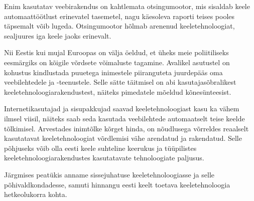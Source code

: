 \begin{multicols}{2}
Enim kasutatav veebirakendus on kahtle\-mata otsingumootor, mis sisaldab keele automaattöötlust erinevatel tasemetel, nagu käesoleva raporti teises pooles täpsemalt võib lugeda.  Otsingumootor hõlmab arenenud keeletehnoloogiat, sealjuures iga keele jaoks erinevalt.

Nii Eestis kui mujal Euroopas on välja öeldud, et üheks meie poliitiliseks eesmärgiks on kõigile võrdsete võimaluste tagamine.  Avalikel asutustel on kohustus kindlustada puuetega inimestele piiranguteta juurdepääs oma veebilehtedele ja -teenustele.  Selle sätte täitmisel on abi kasutajasõbralikest keeletehnoloogiarakendustest, näi\-teks pimedatele mõeldud kõnesünteesist.

Internetikasutajad ja sisupakkujad saavad keeletehnoloogiast kasu ka vähem ilmsel viisil, näiteks saab seda kasutada veebi\-lehtede automaatselt teise keelde tõlkimisel.  Arvestades inimtõlke kõrget hinda, on nõudlusega võrreldes reaalselt kasutatavat keeletehnoloogiat võrdlemisi vähe arendatud ja rakendatud.  Selle põhjuseks võib olla eesti keele suhteline keerukus ja tüüpilistes keeletehnoloogiarakendustes kasutatavate tehnoloogiate paljusus.

Järgmises peatükis anname sissejuhatuse keeletehnoloogiasse ja selle põhivaldkondadesse, samuti hinnangu eesti keelt toetava keeletehnoloogia hetkeolukorra kohta.
\end{multicols}

\clearpage



